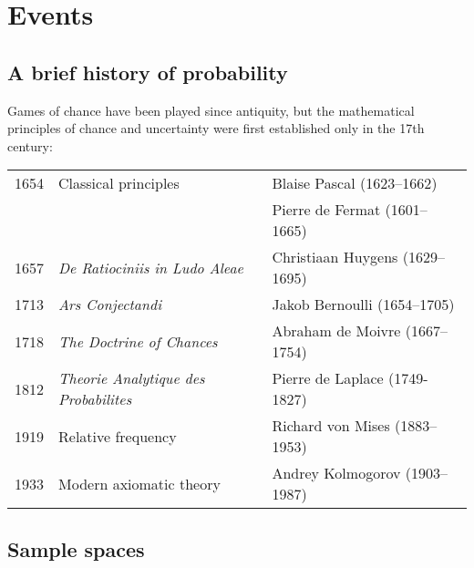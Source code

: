 \chapter{Events}\label{chap:events}

\section{A brief history of probability}
Games of chance have been played since antiquity, but the mathematical principles of chance and uncertainty were first established only in the 17th century:

\bigskip
\begin{center}
\begin{tabular}{lll}
1654		& Classical principles 	& Blaise Pascal (1623--1662) \\
    		&						& Pierre de Fermat (1601--1665)  \\
1657		& \textit{De Ratiociniis in Ludo Aleae} & Christiaan Huygens (1629--1695) \\
1713		& \textit{Ars Conjectandi} & Jakob Bernoulli (1654--1705) \\ 
1718		& \textit{The Doctrine of Chances} & Abraham de Moivre (1667--1754) \\
1812		& \textit{Theorie Analytique des Probabilites} & Pierre de Laplace (1749-1827) \\
1919		& Relative frequency & Richard von Mises (1883--1953) \\
1933		& Modern axiomatic theory & Andrey Kolmogorov (1903--1987)\\
\end{tabular}
\end{center}

\section{Sample spaces}

